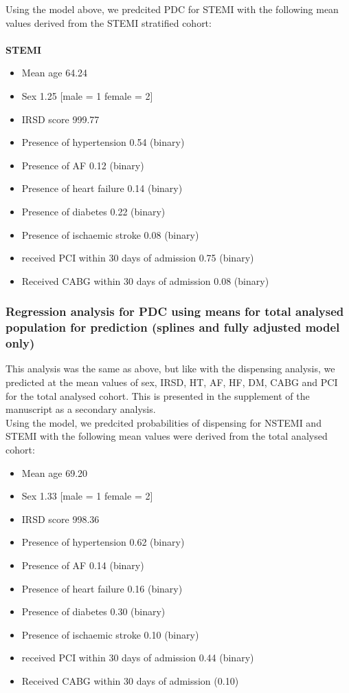 \documentclass[11pt]{article}
\begin{document}
Using the model above, we predcited PDC for STEMI with the following mean values derived from the STEMI stratified cohort: \\~\\
\textbf{STEMI}
\begin{itemize}
\item Mean age 64.24
\item Sex 1.25 [male = 1 female = 2]
\item IRSD score 999.77
\item Presence of hypertension 0.54 (binary)
\item Presence of AF 0.12 (binary)
\item Presence of heart failure 0.14 (binary)
\item Presence of diabetes 0.22 (binary)
\item Presence of ischaemic stroke 0.08 (binary)
\item received PCI within 30 days of admission 0.75 (binary)
\item Received CABG within 30 days of admission 0.08 (binary)
\end{itemize}
\color{violet}
\begin{stlog}\end{stlog}
\color{black}
\subsubsection{Regression analysis for PDC using means for total analysed population for prediction (splines and fully adjusted model only)}
This analysis was the same as above, but like with the dispensing analysis, we predicted at the mean values of sex, IRSD, HT, AF, HF, DM, CABG and PCI for the total analysed cohort. This is presented in the supplement of the manuscript as a secondary analysis. \\
Using the model, we predcited probabilities of dispensing for NSTEMI and STEMI with the following mean values were derived from the total analysed cohort: 
\begin{itemize}
\item Mean age 69.20
\item Sex 1.33 [male = 1 female = 2]
\item IRSD score 998.36
\item Presence of hypertension 0.62 (binary)
\item Presence of AF 0.14 (binary)
\item Presence of heart failure 0.16 (binary)
\item Presence of diabetes 0.30 (binary)
\item Presence of ischaemic stroke 0.10 (binary)
\item received PCI within 30 days of admission 0.44 (binary)
\item Received CABG within 30 days of admission (0.10)
\end{itemize}
\color{violet}
\begin{stlog}\end{stlog}
\color{black}
\end{document}
